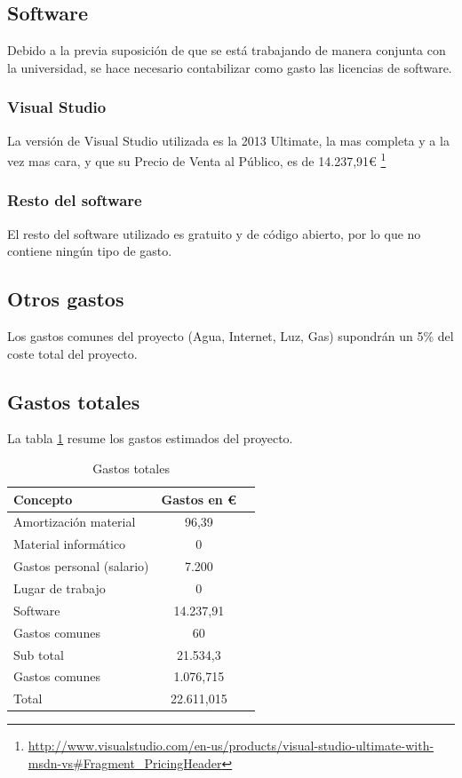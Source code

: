 \subsection{Software}
Debido a la previa suposici\'on de que se est\'a trabajando de manera conjunta con la 
universidad, se hace necesario contabilizar como gasto las licencias de software.

\subsubsection{Visual Studio}
La versi\'on de Visual Studio utilizada es la 2013 Ultimate, la mas completa y a la vez mas
cara, y que su Precio de Venta al P\'ublico, es de 14.237,91€ \footnote{\url{http://www.visualstudio.com/en-us/products/visual-studio-ultimate-with-msdn-vs\#Fragment_PricingHeader}}

\subsubsection{Resto del software}
El resto del software utilizado es gratuito y de c\'odigo abierto, por lo que no contiene
ning\'un tipo de gasto.

\subsection{Otros gastos}
Los gastos comunes del proyecto (Agua, Internet, Luz, Gas) supondr\'an un 5\% del coste
total del proyecto.

\subsection{Gastos totales}
La tabla \ref{GastosTotales} resume los gastos estimados del proyecto.
\begin{table}[H]
	\begin{center}
		\begin{tabular}{l*{1}{c}r}
		    Concepto                   & Gastos en € & \\
		    \hline
		    Amortizaci\'on material    & 96,39  & \\
		    Material inform\'atico     & 0 & \\ 
		    Gastos personal (salario)  & 7.200 & \\
		    Lugar de trabajo           & 0 & \\
		    Software                   & 14.237,91 & \\
		    Gastos comunes             & 60 & \\
		    \hline
		    Sub total				   & 21.534,3 & \\
		    \hline
		    Gastos comunes			   & 1.076,715 & \\
		    \hline
		    Total		               & 22.611,015 &\\
		\end{tabular}
	\caption[Gastos totales]{Gastos totales}
	\label{GastosTotales}
	\end{center}
\end{table}


